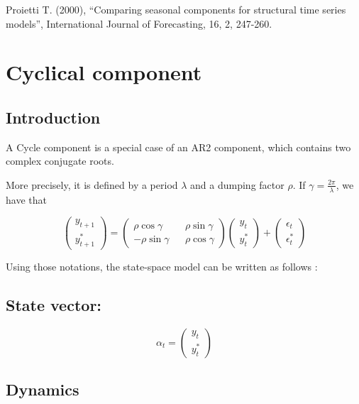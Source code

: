 \documentclass[
  letterpaper,
  DIV=11,
  numbers=noendperiod]{scrreprt}
\begin{document}
Proietti T. (2000), ``Comparing seasonal components for structural time
series models'', International Journal of Forecasting, 16, 2, 247-260.

\section{Cyclical component}\label{cyclical-component}

\subsection{Introduction}\label{introduction-5}

A Cycle component is a special case of an AR2 component, which contains
two complex conjugate roots.

More precisely, it is defined by a period \(\lambda\) and a dumping
factor \(\rho\). If \(\gamma = \frac{2\pi}{\lambda}\), we have that

\[   \begin{pmatrix} y_{t+1} \\ y^*_{t+1}\end {pmatrix} = \begin{pmatrix} \rho \cos{\gamma} &&   \rho \sin{\gamma}\\  -\rho \sin{\gamma}  && \rho \cos{\gamma}\end {pmatrix}\begin{pmatrix} y_t \\ y_t^*\end {pmatrix}+\begin{pmatrix} \epsilon_t \\ \epsilon_t^*\end {pmatrix} \]

Using those notations, the state-space model can be written as follows :

\subsection{State vector:}\label{state-vector-7}

\[ \alpha_t= \begin{pmatrix} y_t \\ y_t^* \end{pmatrix}\]

\subsection{Dynamics}\label{dynamics-7}
\end{document}
